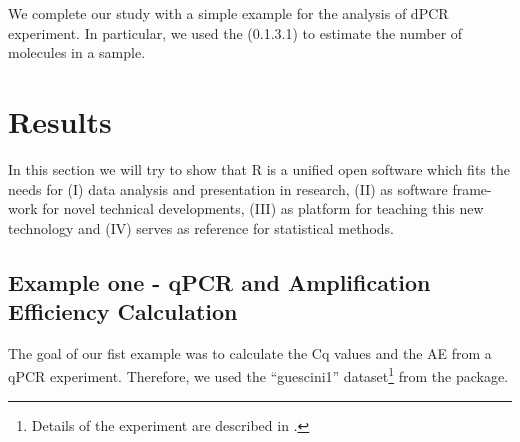 We complete our study with a simple example for the analysis of dPCR experiment. 
In particular, we used the  (0.1.3.1) to estimate the number of 
molecules in a sample.

\section{Results}

In this section we will try to show that R is a unified open software which fits 
the needs for (I) data analysis and presentation in research, (II) as software 
frame-work for novel technical developments, (III) as platform for teaching this 
new technology and (IV) serves as reference for statistical methods.

\subsection{Example one - qPCR and Amplification Efficiency Calculation}

The goal of our fist example was to calculate the Cq values and the AE from a 
qPCR experiment. Therefore, we used the ``guescini1'' dataset\footnote{Details 
of the experiment are described in \citet{guescini_2008}.} from the 
 package.

